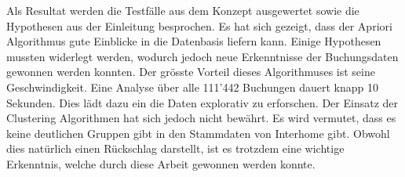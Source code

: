 Als Resultat werden die Testfälle aus dem Konzept ausgewertet sowie die Hypothesen aus der Einleitung besprochen. Es hat sich gezeigt, dass der Apriori Algorithmus gute Einblicke in die Datenbasis liefern kann. Einige Hypothesen mussten widerlegt werden, wodurch jedoch neue Erkenntnisse der Buchungsdaten gewonnen werden konnten. Der grösste Vorteil dieses Algorithmuses ist seine Geschwindigkeit. Eine Analyse über alle 111'442 Buchungen dauert knapp 10 Sekunden. Dies lädt dazu ein die Daten explorativ zu erforschen. Der Einsatz der Clustering Algorithmen hat sich jedoch nicht bewährt. Es wird vermutet, dass es keine deutlichen Gruppen gibt in den Stammdaten von Interhome gibt. Obwohl dies natürlich einen Rückschlag darstellt, ist es trotzdem eine wichtige Erkenntnis, welche durch diese Arbeit gewonnen werden konnte. 

